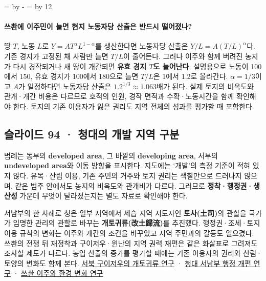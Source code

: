 \documentclass[10pt,a4paper]{article}
\newcommand{\ReserveQuestionSpace}{%
  \par\begingroup
  \dimen0=\pagegoal \advance\dimen0 by -\pagetotal
  \dimen2=\baselineskip \multiply\dimen2 by 12
  \ifdim\dimen0<\dimen2 \newpage\fi
  \endgroup}
\begin{document}
\ReserveQuestionSpace
\paragraph{쓰촨에 이주민이 늘면 현지 노동자당 산출은 반드시 떨어졌나?}
땅 $T$, 노동 $L$로 $Y=AT^{\alpha}L^{1-\alpha}$를 생산한다면 노동자당 산출은 $Y/L=A(T/L)^{\alpha}$다. 기존 경지가 고정된 채 사람만 늘면 $T/L$이 줄어든다. 그러나 이주와 함께 버려진 농지가 다시 경작되거나 새 땅이 개간되면 \textbf{유효 경지 $T$도 늘어난다}. 설명용으로 노동이 100에서 150, 유효 경지가 100에서 180으로 늘면 $T/L$은 1에서 1.2로 올라간다. $\alpha=1/3$이고 $A$가 일정하다면 노동자당 산출은 $1.2^{1/3}\approx1.063$배가 된다. 실제 토지의 비옥도와 관개·개간 비용은 다르므로 호적의 인원, 경작 면적과 수확·노동시간을 함께 확인해야 한다. 토지의 기존 이용자가 잃은 권리도 지역 전체의 성과를 평가할 때 포함한다.\par

\subsection{슬라이드 94 · 청대의 개발 지역 구분}
범례는 동부의 \textbf{developed area}, 그 바깥의 \textbf{developing area}, 서부의 \textbf{undeveloped area}와 이동 방향을 표시한다. 지도에는 ‘개발’의 측정 기준이 적혀 있지 않다. 유목·산림 이용, 기존 주민의 거주와 토지 권리는 색칠만으로 드러나지 않으며, 같은 범주 안에서도 농지의 비옥도와 관개비가 다르다. 그러므로 \textbf{정착·행정권·생산성} 가운데 무엇이 달라졌는지는 별도 자료로 확인해야 한다.\par

서남부의 한 사례로 청은 일부 지역에서 세습 지역 지도자인 \textbf{토사(土司)}의 관할을 국가가 임명한 관리의 관할로 바꾸는 \textbf{개토귀류(改土歸流)}를 추진했다. 행정권·조세·토지 이용 규칙의 변화는 이주와 개간의 조건을 바꾸었고 지역 주민과의 갈등도 일으켰다. 쓰촨의 전쟁 뒤 재정착과 구이저우·윈난의 지역 권력 재편은 같은 화살표로 그려져도 조사할 제도가 다르다. 농업 산출의 증가를 평가할 때에는 기존 이용자의 권리와 산림·토양의 변화도 함께 본다. \href{https://www1.ihp.sinica.edu.tw/en/Publications/Bulletin/1118/Article/268}{서북 구이저우의 개토귀류 연구} · \href{https://www.cambridge.org/core/journals/journal-of-asian-studies/article/abs/empire-in-the-southwest-early-qing-reforms-to-the-native-chieftain-system/CB30FEE308E2755FF52AC55201029420}{청대 서남부 행정 개편 연구} · \href{https://www.nopss.gov.cn/GB/219506/219508/219522/14640051.html}{쓰촨 이주와 환경 변화 연구}\par
\end{document}
